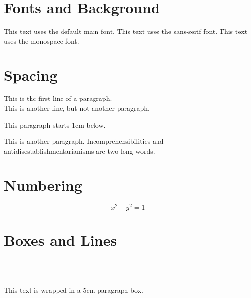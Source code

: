 \documentclass[12pt, a4paper]{article}
\begin{document}

\section{Fonts and Background}

This text uses the default main font.
{\sffamily This text uses the sans-serif font.}
{\ttfamily This text uses the monospace font.}

\section{Spacing}

This is the first line of a paragraph.\\
This is another line, but not another paragraph.

\vspace{1cm}
This paragraph starts 1cm below.

{\sloppy This is another paragraph. Incomprehensibilities and antidisestablishmentarianisms are two long words.}

\newpage

\section{Numbering}
\begin{equation}
    x^2 + y^2 = 1
\end{equation}

\section{Boxes and Lines}

\newsavebox{\mybox}

\usebox{\mybox}\\
\usebox{\mybox}\\
\usebox{\mybox}

\parbox{5cm}{This text is wrapped in a 5cm paragraph box.}

\printindex



\end{document}
